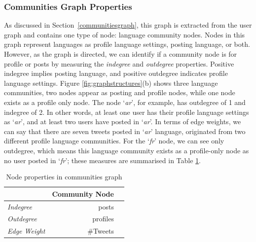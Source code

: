\documentclass{llncs}
\begin{document}
\subsubsection{Communities Graph Properties}

As discussed in Section~\ref{communitiesgraph}, this graph is
extracted from the user graph and contains one type of node: language
community nodes. Nodes in this graph represent languages as profile
language settings, posting language, or both.  However, as the graph
is directed, we can identify if a community node is for profile or
posts by measuring the \emph{indegree} and \emph{outdegree}
properties.  Positive indegree implies posting language, and positive
outdegree indicates profile language settings. Figure
\ref{fig:graphstructures}(b) shows three language communities, two
nodes appear as posting and profile nodes, while one node exists as a
profile only node. The node `{\emph{ar}}', for example, has outdegree
of 1 and indegree of 2.  In other words, at least one user has their
profile language settings as `{\emph{ar}}', and at least two users
have posted in `{\emph{ar}}'. In terms of edge weights, we can say
that there are seven tweets posted in `{\emph{ar}}' language,
originated from two different profile language communities.  For the
`{\emph{fr}}' node, we can see only outdegree, which means this
language community exists as a profile-only node as no user posted in
`{\emph{fr}}'; these measures are summarised in Table
\ref{tbl:communitiesgraph}.

\begin{table}[htb]
\centering
\caption{Node properties in communities graph}
\begin{tabular}{@{}lrr@{}}
\toprule
\textbf{}& \textbf{Community Node} \\ \midrule
{\emph{Indegree}} &  posts\\
{\emph{Outdegree}} & profiles \\ 
{\emph{Edge Weight}}& \#Tweets\\ \bottomrule
\end{tabular}
\label{tbl:communitiesgraph}
\end{table}

\end{document}

